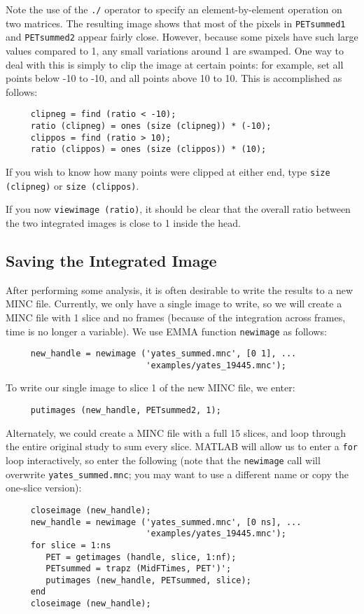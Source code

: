 Note the use of the \verb|./| operator to specify an
element-by-element operation on two matrices.  The resulting image
shows that most of the pixels in \verb|PETsummed1| and
\verb|PETsummed2| appear fairly close.  However, because some pixels
have such large values compared to 1, any small variations around 1
are swamped.  One way to deal with this is simply to clip the image
at certain points: for example, set all points below -10 to -10, and
all points above 10 to 10.  This is accomplished as follows:
\begin{verbatim}
     clipneg = find (ratio < -10);
     ratio (clipneg) = ones (size (clipneg)) * (-10);
     clippos = find (ratio > 10);
     ratio (clippos) = ones (size (clippos)) * (10);
\end{verbatim}

If you wish to know how many points were clipped at either end,
type \verb|size (clipneg)| or \verb|size (clippos)|.

If you now \verb|viewimage (ratio)|, it should be clear that the
overall ratio between the two integrated images is close to 1 inside
the head.

\subsection{Saving the Integrated Image}

After performing some analysis, it is often desirable to write the
results to a new MINC file.  Currently, we only have a single image to
write, so we will create a MINC file with 1 slice and no frames
(because of the integration across frames, time is no longer a
variable).  We use EMMA function \verb|newimage| as follows:
\begin{verbatim}
     new_handle = newimage ('yates_summed.mnc', [0 1], ...
                            'examples/yates_19445.mnc');
\end{verbatim}
To write our single image to slice 1 of the new MINC file, we enter:
\begin{verbatim}
     putimages (new_handle, PETsummed2, 1);
\end{verbatim}

Alternately, we could create a MINC file with a full 15 slices, and
loop through the entire original study to sum every slice.  MATLAB
will allow us to enter a \verb|for| loop interactively, so enter the
following (note that the \verb|newimage| call will overwrite
\verb|yates_summed.mnc|; you may want to use a different name or copy
the one-slice version):
\begin{verbatim}
     closeimage (new_handle);
     new_handle = newimage ('yates_summed.mnc', [0 ns], ...
                            'examples/yates_19445.mnc');
     for slice = 1:ns
        PET = getimages (handle, slice, 1:nf);
        PETsummed = trapz (MidFTimes, PET')';
        putimages (new_handle, PETsummed, slice);
     end
     closeimage (new_handle);
\end{verbatim}

